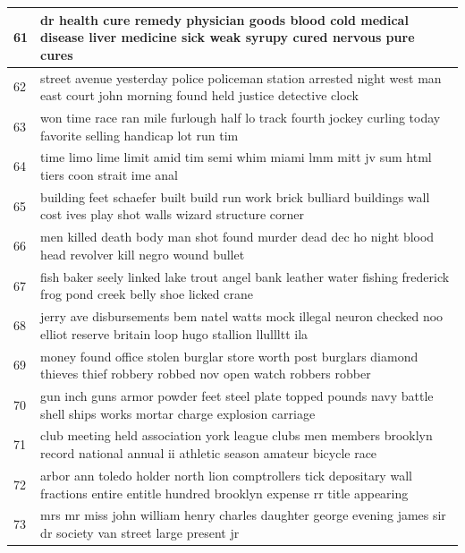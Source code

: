 \documentclass[letterpaper,11pt]{report}
\begin{document}
\begin{longtable}[c]{| p{1cm} | p{16cm} |}
61 & dr health cure remedy physician goods blood cold medical disease liver medicine sick weak syrupy cured nervous pure cures                                        \\ \hline
62 & street avenue yesterday police policeman station arrested night west man east court john morning found held justice detective clock                              \\ \hline
63 & won time race ran mile furlough half lo track fourth jockey curling today favorite selling handicap lot run tim                                                  \\ \hline
64 & time limo lime limit amid tim semi whim miami lmm mitt jv sum html tiers coon strait ime anal                                                                    \\ \hline
65 & building feet schaefer built build run work brick bulliard buildings wall cost ives play shot walls wizard structure corner                                      \\ \hline
66 & men killed death body man shot found murder dead dec ho night blood head revolver kill negro wound bullet                                                        \\ \hline
67 & fish baker seely linked lake trout angel bank leather water fishing frederick frog pond creek belly shoe licked crane                                            \\ \hline
68 & jerry ave disbursements bem natel watts mock illegal neuron checked noo elliot reserve britain loop hugo stallion llullltt ila                                   \\ \hline
69 & money found office stolen burglar store worth post burglars diamond thieves thief robbery robbed nov open watch robbers robber                                   \\ \hline
70 & gun inch guns armor powder feet steel plate topped pounds navy battle shell ships works mortar charge explosion carriage                                         \\ \hline
71 & club meeting held association york league clubs men members brooklyn record national annual ii athletic season amateur bicycle race                              \\ \hline
72 & arbor ann toledo holder north lion comptrollers tick depositary wall fractions entire entitle hundred brooklyn expense rr title appearing                        \\ \hline
73 & mrs mr miss john william henry charles daughter george evening james sir dr society van street large present jr                                                  \\ \hline

\end{longtable}
\end{document}
